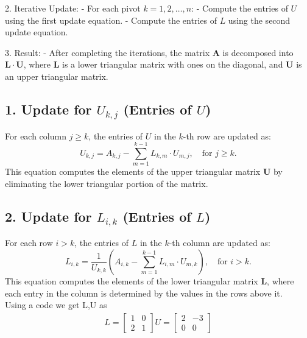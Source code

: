 \documentclass[journal]{IEEEtran}
\begin{document}
2. Iterative Update:
   - For each pivot $ k = 1, 2, \ldots, n $:
     - Compute the entries of $ U $ using the first update equation.
     - Compute the entries of $ L $ using the second update equation.
   
3. Result:
   - After completing the iterations, the matrix $ \mathbf{A} $ is decomposed into $ \mathbf{L} \cdot \mathbf{U} $, where $ \mathbf{L} $ is a lower triangular matrix with ones on the diagonal, and $ \mathbf{U} $ is an upper triangular matrix.

    

\subsection*{1. Update for $ U_{k,j} $ (Entries of $ U $)}

For each column $ j \geq k $, the entries of $ U $ in the $ k $-th row are updated as:
\[
U_{k,j} = A_{k,j} - \sum_{m=1}^{k-1} L_{k,m} \cdot U_{m,j}, \quad \text{for } j \geq k.
\]
This equation computes the elements of the upper triangular matrix $ \mathbf{U} $ by eliminating the lower triangular portion of the matrix.

\subsection*{2. Update for $ L_{i,k} $ (Entries of $ L $)}

For each row $ i > k $, the entries of $ L $ in the $ k $-th column are updated as:
\[
L_{i,k} = \frac{1}{U_{k,k}} \left( A_{i,k} - \sum_{m=1}^{k-1} L_{i,m} \cdot U_{m,k} \right), \quad \text{for } i > k.
\]
This equation computes the elements of the lower triangular matrix $ \mathbf{L} $, where each entry in the column is determined by the values in the rows above it.\\
Using a code we get L,U as 
\begin{align}
    L=\begin{bmatrix} 1 & 0 \\ 2 & 1 \end{bmatrix}
    U=\begin{bmatrix} 2 & -3 \\ 0 & 0 \end{bmatrix}
\end{align}
\end{document}

